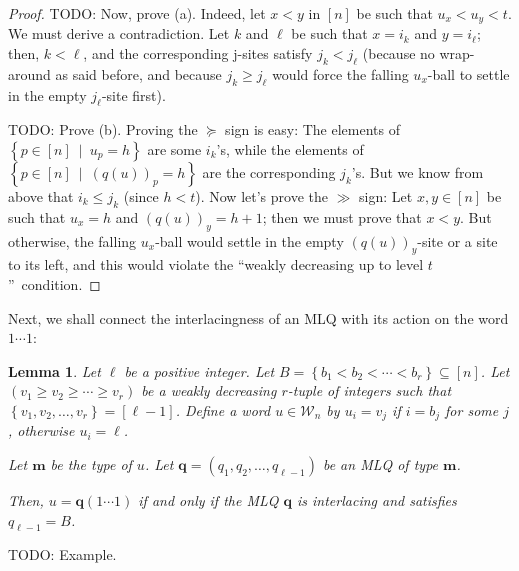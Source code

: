 \documentclass[reqno]{amsart}
\newcommand{\0}{\phantom{c}}
\theoremstyle{plain}
\newtheorem{lemma}[thm]{Lemma}
\theoremstyle{definition}
\numberwithin{equation}{section}
\begin{document}
\begin{proof}
TODO: Now, prove (a). Indeed, let $x<y$ in $\left[  n\right]  $ be such that
$u_{x}<u_{y}<t$. We must derive a contradiction. Let $k$ and $\ell$ be such
that $x=i_{k}$ and $y=i_{\ell}$; then, $k<\ell$, and the corresponding j-sites
satisfy $j_{k}<j_{\ell}$ (because no wrap-around as said before, and because
$j_{k}\geq j_{\ell}$ would force the falling $u_{x}$-ball to settle in the
empty $j_{\ell}$-site first).

TODO: Prove (b). Proving the $\succeq$ sign is easy: The elements of $\left\{
p\in\left[  n\right]  \ \mid\ u_{p}=h\right\}  $ are some $i_{k}$'s, while the
elements of $\left\{  p\in\left[  n\right]  \ \mid\ \left(  q\left(  u\right)
\right)  _{p}=h\right\}  $ are the corresponding $j_{k}$'s. But we know from
above that $i_{k}\leq j_{k}$ (since $h<t$). Now let's prove the $\gg$ sign:
Let $x,y\in\left[  n\right]  $ be such that $u_{x}=h$ and $\left(  q\left(
u\right)  \right)  _{y}=h+1$; then we must prove that $x<y$. But otherwise,
the falling $u_{x}$-ball would settle in the empty $\left(  q\left(  u\right)
\right)  _{y}$-site or a site to its left, and this would violate the
\textquotedblleft weakly decreasing up to level $t$\textquotedblright\ condition.
\end{proof}

Next, we shall connect the interlacingness of an MLQ with its action on the
word $1\cdots1$:

\begin{lemma}
\label{lem:determinant_form.interl-act}Let $\ell$ be a positive integer. Let
$B=\left\{  b_{1}<b_{2}<\cdots<b_{r}\right\}  \subseteq\left[  n\right]  $.
Let $\left(  v_{1}\geq v_{2}\geq\dotsm\geq v_{r}\right)  $ be a weakly
decreasing $r$-tuple of integers such that $\left\{  v_{1},v_{2},\ldots
,v_{r}\right\}  =\left[  \ell-1\right]  $. Define a word $u\in\mathcal{W}_{n}$
by $u_{i}=v_{j}$ if $i=b_{j}$ for some $j$, otherwise $u_{i}=\ell$.

Let $\mathbf{m}$ be the type of $u$. Let $\mathbf{q}=\left(  q_{1}%
,q_{2},\ldots,q_{\ell-1}\right)  $ be an MLQ of type $\mathbf{m}$.

Then, $u=\mathbf{q}\left(  1\cdots1\right)  $ if and only if the MLQ
$\mathbf{q}$ is interlacing and satisfies $q_{\ell-1}=B$.
\end{lemma}

TODO: Example.
\end{document}
